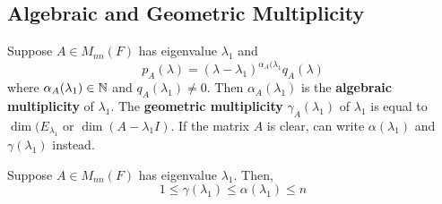 \documentclass{article}
\begin{document}
\subsection{Algebraic and Geometric Multiplicity}
\begin{definition}
  Suppose $A \in M_{nn}(F)$ has eigenvalue $\lambda_1$ and \[
    p_A(\lambda) = (\lambda - \lambda_1)^{\alpha_A(\lambda_1}q_A(\lambda)
    \] where $\alpha_A(\lambda_1) \in \mathbb{N}$ and $q_A(\lambda_1) \neq 0$. Then $\alpha_A(\lambda_1)$ is the \textbf{algebraic multiplicity} of $\lambda_1$. The \textbf{geometric multiplicity} $\gamma_A(\lambda_1)$ of $\lambda_1$ is equal to $\dim(E_{\lambda_1}$ or $\dim (A - \lambda_1I)$. If the matrix $A$ is clear, can write $\alpha(\lambda_1)$ and $\gamma(\lambda_1)$ instead.
    \end{definition}
    \begin{theorem}
      Suppose $A \in M_{nn}(F)$ has eigenvalue $\lambda_1$. Then, \[
        1 \leq \gamma(\lambda_1) \leq \alpha(\lambda_1) \leq n
      \]
    \end{theorem}
\end{document}
